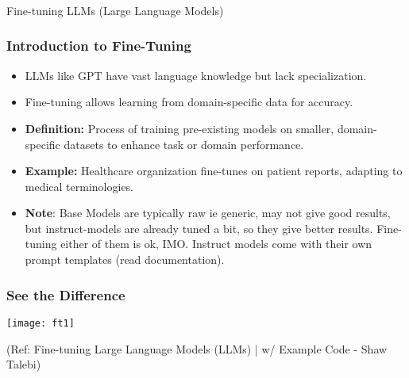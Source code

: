 \begin{frame}[fragile]\frametitle{}
\begin{center}
{\Large Fine-tuning LLMs (Large Language Models)}
\end{center}
\end{frame}

\begin{frame}[fragile]\frametitle{Introduction to Fine-Tuning}
  \begin{itemize}
      \item LLMs like GPT have vast language knowledge but lack specialization.
    \item Fine-tuning allows learning from domain-specific data for accuracy.
    \item \textbf{Definition:} Process of training pre-existing models on smaller, domain-specific datasets to enhance task or domain performance.

    \item \textbf{Example:} Healthcare organization fine-tunes on patient reports, adapting to medical terminologies.
	

	
	\item \textbf{Note}: Base Models are typically raw ie generic, may not give good results, but instruct-models are already tuned a bit, so they give better results. Fine-tuning either of them is ok, IMO. Instruct models come with their own prompt templates (read documentation).

  \end{itemize}
\end{frame}

\begin{frame}[fragile]\frametitle{See the Difference}


		\begin{center}
		\texttt{[image: ft1]}
		\end{center}

{\tiny (Ref: Fine-tuning Large Language Models (LLMs) | w/ Example Code - Shaw Talebi)}

\end{frame}



